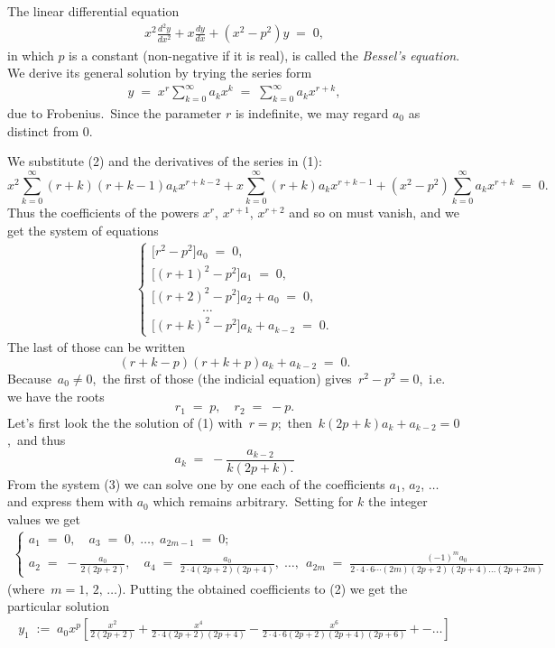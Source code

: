 \documentclass[12pt]{article}
\begin{document}
 
The linear differential equation 
\begin{align}
  x^2\frac{d^2y}{dx^2}+x\frac{dy}{dx}+(x^2-p^2)y \;=\; 0,
\end{align}
in which $p$ is a constant (non-negative if it is real), is called the {\em Bessel's equation}.\, We derive its general solution by trying the series form
\begin{align}
               y \;=\; x^r\sum_{k=0}^\infty a_kx^k \;=\; \sum_{k=0}^\infty a_kx^{r+k},
\end{align}
due to Frobenius.\, Since the parameter $r$ is indefinite, we may regard $a_0$ as distinct from 0.

We substitute (2) and the derivatives of the series in (1):
$$
x^2\sum_{k=0}^\infty(r+k)(r+k-1)a_kx^{r+k-2}+
  x\sum_{k=0}^\infty(r+k)a_kx^{r+k-1}+
(x^2-p^2)\sum_{k=0}^\infty a_kx^{r+k} \;=\; 0.
$$
Thus the coefficients of the powers $x^r$, $x^{r+1}$, $x^{r+2}$ and so on must vanish, and we get the system of equations
\begin{align}
\begin{cases}
{[}r^2-p^2{]}a_0 \;=\; 0,\\
{[}(r+1)^2-p^2{]}a_1 \;=\; 0,\\
{[}(r+2)^2-p^2{]}a_2+a_0 \;=\; 0,\\
\qquad \qquad \ldots\\
{[}(r+k)^2-p^2{]}a_k+a_{k-2} \;=\; 0.
\end{cases}
\end{align}
The last of those can be written
$$(r+k-p)(r+k+p)a_k+a_{k-2} \;=\; 0.$$
Because\, $a_0 \neq 0$,\, the first of those (the indicial equation) gives\, $r^2-p^2 = 0$,\, i.e. we have the roots
$$r_1 \;=\; p, \quad r_2 \;=\; -p.$$
Let's first look the the solution of (1) with\, $r = p$;\, then\, $k(2p+k)a_k+a_{k-2} = 0$,\, and thus\,
$$a_k \;=\; -\frac{a_{k-2}}{k(2p+k).}$$
From the system (3) we can solve one by one each of the coefficients $a_1$, $a_2$, $\ldots$\, and express them with $a_0$ which remains arbitrary.\, Setting for $k$ the integer values we get
\begin{align}
\begin{cases}
a_1 \;=\; 0, \quad a_3 \;=\; 0,\;\ldots,\; a_{2m-1} \;=\; 0;\\
a_2 \;=\; -\frac{a_0}{2(2p+2)}, \quad a_4 \;=\; \frac{a_0}{2\cdot4(2p+2)(2p+4)},\;\ldots,\;\,
a_{2m} \;=\; \frac{(-1)^ma_0}{2\cdot4\cdot6\cdots(2m)(2p+2)(2p+4)\ldots(2p+2m)}
\end{cases}
\end{align}
(where\, $m = 1,\,2,\,\ldots$).
Putting the obtained coefficients to (2) we get the particular solution 
\begin{align}
 y_1 \;:=\; a_0x^p \left[\!\frac{x^2}{2(2p\!+\!2)}\!
+\!\frac{x^4}{2\!\cdot\!4(2p\!+\!2)(2p\!+\!4)}
\!-\!\frac{x^6}{2\!\cdot\!4\!\cdot\!6(2p\!+\!2)(2p\!+\!4)(2p\!+\!6)}\!+-\ldots\right]
\end{align}
\end{document}
